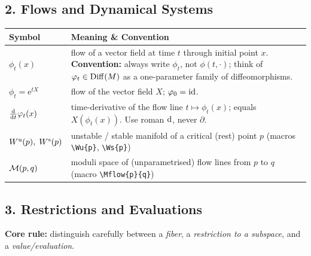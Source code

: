 \subsection*{2. Flows and Dynamical Systems}

\begin{longtable}{@{} p{4cm} p{10cm} @{}}
	\toprule
	\textbf{Symbol} & \textbf{Meaning \& Convention} \\
	\midrule
	\endhead
	
	$\phi_t(x)$
	& flow of a vector field at time $t$ through initial point $x$.
	\textbf{Convention:} always write $\phi_t$, not $\phi(t,\cdot)$;
	think of $\varphi_t\in\operatorname{\mathrm{Diff}}(M)$ as a one-parameter family of
	diffeomorphisms.\\[4pt]
	
	$\phi_t = \mathrm{e}^{t X}$
	& flow of the vector field $X$; $\varphi_0 = \operatorname{\mathrm{id}}$. \\[4pt]
	
	$\frac{\mathop{}\!\mathrm{d}}{\mathop{}\!\mathrm{d} t}\varphi_t(x)$
	& time-derivative of the flow line $t\mapsto\phi_t(x)$;
	equals $X(\phi_t(x))$. Use roman $\mathop{}\!\mathrm{d}$, never $\partial$. \\[4pt]
	
	$W^{\mathrm{u}}(p),\;W^{\mathrm{s}}(p)$
	& unstable / stable manifold of a critical (rest) point $p$
	(macros \texttt{\textbackslash Wu\{p\}}, \texttt{\textbackslash Ws\{p\}}) \\[4pt]
	
	$\mathcal{M}(p,q)$
	& moduli space of (unparametrised) flow lines from $p$ to $q$
	(macro \texttt{\textbackslash Mflow\{p\}\{q\}}) \\[4pt]
	
	\bottomrule
\end{longtable}

\subsection*{3. Restrictions and Evaluations}

\medskip\noindent
\textbf{Core rule:} distinguish carefully between a \emph{fiber},
a \emph{restriction to a subspace}, and a \emph{value/evaluation}.

